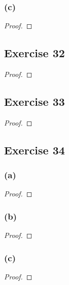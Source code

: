 \documentclass[14pt]{extarticle}
\begin{document}
\subsubsection{(c)}

\begin{proof}

\end{proof}

\subsection{Exercise 32}

\begin{proof}

\end{proof}

\subsection{Exercise 33}

\begin{proof}

\end{proof}

\subsection{Exercise 34}

\subsubsection{(a)}

\begin{proof}

\end{proof}

\subsubsection{(b)}

\begin{proof}

\end{proof}

\subsubsection{(c)}

\begin{proof}

\end{proof}
\end{document}
